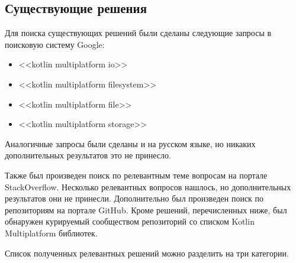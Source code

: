 \subsection{Существующие решения}
  Для поиска существующих решений были сделаны следующие запросы в поисковую систему Google:
  \begin{itemize}
    \item <<kotlin multiplatform io>>
    \item <<kotlin multiplatform filesystem>>
    \item <<kotlin multiplatform file>>
    \item <<kotlin multiplatform storage>>
  \end{itemize}
  Аналогичные запросы были сделаны и на русском языке, но никаких дополнительных результатов это не принесло.

  Также был произведен поиск по релевантным теме вопросам на портале StackOverflow\cite{stackoverflow}. Несколько релевантных вопросов нашлось\cite{so-file-io-with-kotlin-multiplatform,so-read-write-file-in-kotlin-native-ios-side}, но дополнительных результатов они не принесли.
  Дополнительно был произведен поиск по репозиториям на портале GitHub\cite{github}. Кроме решений, перечисленных ниже, был обнаружен курируемый сообществом репозиторий со списком Kotlin Multiplatform библиотек\cite{gh-kotlin-multiplatform-libs}.

  Список полученных релевантных решений можно разделить на три категории.

  \newcommand{\existingsolution}[3]{\item \textbf{#1}#2\par#3}

